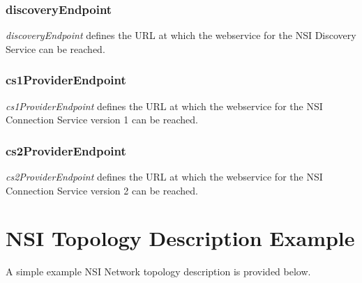 \documentclass[12pt]{article}  %
\begin{document}
\subsubsection{discoveryEndpoint} %
\label{ssub:discoveryendpoint}

\emph{discoveryEndpoint} defines the URL at which the webservice for the NSI Discovery Service can be reached.

\subsubsection{cs1ProviderEndpoint} %
\label{ssub:cs1providerendpoint}

\emph{cs1ProviderEndpoint} defines the URL at which the webservice for the NSI Connection Service version 1 can be reached.

\subsubsection{cs2ProviderEndpoint} %
\label{ssub:cs2providerendpoint}

\emph{cs2ProviderEndpoint} defines the URL at which the webservice for the NSI Connection Service version 2 can be reached.


\section{NSI Topology Description Example}

 A simple example NSI Network topology description is provided 
below. 
\end{document}
